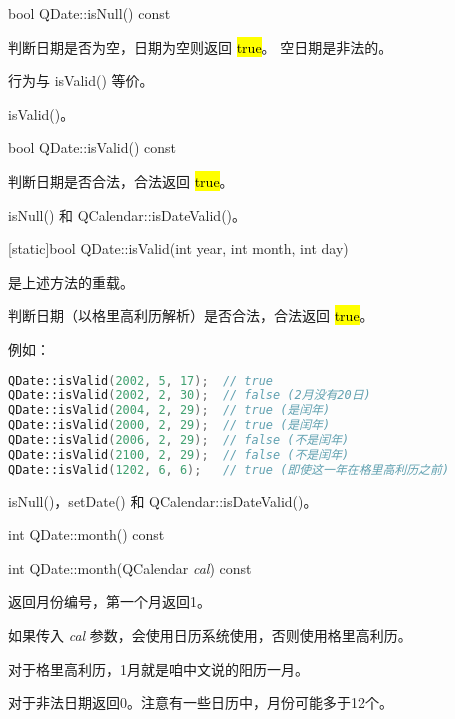 \splitLine

bool QDate::isNull() const

判断日期是否为空，日期为空则返回 \hl{true}。 空日期是非法的。

\begin{notice}
行为与 isValid() 等价。
\end{notice}

\begin{notice}[另请参阅]
isValid()。
\end{notice}

\splitLine

bool QDate::isValid() const

判断日期是否合法，合法返回 \hl{true}。



\begin{notice}[另请参阅]
isNull() 和 QCalendar::isDateValid()。
\end{notice}

\splitLine

[static]bool QDate::isValid(int year, int month, int day)

是上述方法的重载。

判断日期（以格里高利历解析）是否合法，合法返回 \hl{true}。

例如：

\begin{lstlisting}[language=C++]
QDate::isValid(2002, 5, 17);  // true
QDate::isValid(2002, 2, 30);  // false (2月没有20日)
QDate::isValid(2004, 2, 29);  // true (是闰年)
QDate::isValid(2000, 2, 29);  // true (是闰年)
QDate::isValid(2006, 2, 29);  // false (不是闰年)
QDate::isValid(2100, 2, 29);  // false (不是闰年)
QDate::isValid(1202, 6, 6);   // true (即使这一年在格里高利历之前)
\end{lstlisting}


\begin{notice}[另请参阅]
isNull()，setDate() 和 QCalendar::isDateValid()。
\end{notice}

\splitLine

int QDate::month() const

int QDate::month(QCalendar \emph{cal}) const

返回月份编号，第一个月返回1。

如果传入 \emph{cal} 参数，会使用日历系统使用，否则使用格里高利历。

对于格里高利历，1月就是咱中文说的阳历一月。

对于非法日期返回0。注意有一些日历中，月份可能多于12个。



